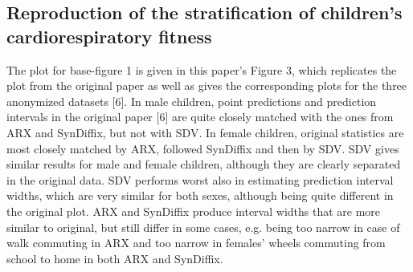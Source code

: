 \documentclass[10pt]{article}
\newcommand{\mycite}[1]{[#1]}
\begin{document}
%
%

\subsection*{Reproduction of the stratification of children's cardiorespiratory fitness}

The plot for base-figure 1 is given in this paper's Figure 3, which replicates the plot from the original paper as well as gives the corresponding plots for the three anonymized datasets \mycite{6}.
In male children, point predictions and prediction intervals in the original paper \mycite{6} are quite closely matched with the ones from ARX and SynDiffix, but not with SDV. 
In female children, original statistics are most closely matched by ARX, followed SynDiffix and then by SDV.
SDV gives similar results for male and female children, although they are clearly separated in the original data. SDV performs worst also in estimating prediction interval widths, which are very similar for both sexes, although being quite different in the original plot. ARX and SynDiffix produce interval widths that are more similar to original, but still differ in some cases, e.g. being too narrow in case of walk commuting in ARX and too narrow in females' wheels commuting from school to home in both ARX and SynDiffix.
\end{document}

